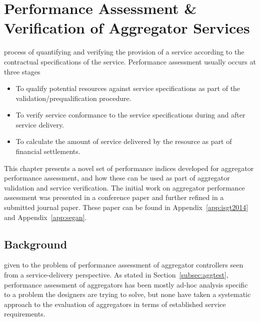 \chapter{Performance Assessment \& Verification of Aggregator Services} %
\label{cha:verification}
 process of quantifying and verifying the provision of a service according to the contractual specifications of the service. Performance assessment usually occurs at three stages
\begin{itemize}
	\item To qualify potential resources against service specifications as part of the validation/prequalification procedure.
	\item To verify service conformance to the service specifications during and after service delivery. 
	\item To calculate the amount of service delivered by the resource as part of financial settlements.
\end{itemize}

This chapter presents a novel set of performance indices developed for aggregator performance assessment, and how these can be used as part of aggregator validation and service verification. The initial work on aggregator performance assessment was presented in a conference paper and further refined in a submitted journal paper. These paper can be found in Appendix~\ref{app:isgt2014} and Appendix~\ref{app:segan}. 
\section{Background}
 given to the problem of performance assessment of aggregator controllers seen from a service-delivery perspective. As stated in Section~\ref{subsec:aggtest}, performance assessment of aggregators has been mostly ad-hoc analysis specific to a problem the designers are trying to solve, but none have taken a systematic approach to the evaluation of aggregators in terms of established service requirements.

